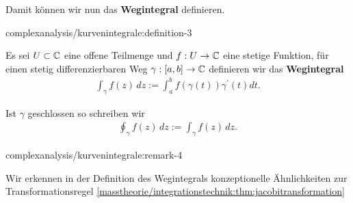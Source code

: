 \par
Damit können wir nun das \textbf{Wegintegral} definieren.
\begin{definition}{}{complexanalysis/kurvenintegrale:definition-3}



\par
Es sei \(U\subset\mathbb{C}\) eine offene Teilmenge und \(f:U\to\mathbb{C}\) eine stetige Funktion, für einen stetig differenzierbaren Weg \(\gamma:[a,b]\to\mathbb{C}\) definieren wir das \textbf{Wegintegral}
\begin{align*}
\int_\gamma f(z)\, dz := \int_a^b f(\gamma(t))\gamma^\prime(t)dt.
\end{align*}
\par
Ist \(\gamma\) geschlossen so schreiben wir
\begin{align*}
\oint_\gamma f(z)\, dz:=\int_\gamma f(z)\, dz.
\end{align*}\end{definition}
\begin{remark}{}{complexanalysis/kurvenintegrale:remark-4}



\par
Wir erkennen in der Definition des Wegintegrals konzeptionelle Ähnlichkeiten zur Transformationsregel \cref{masstheorie/integrationstechnik:thm:jacobitransformation} 
\end{remark}


